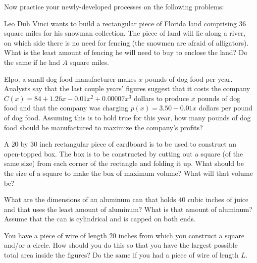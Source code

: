 \documentclass{ximera}
\begin{document}
 
Now practice your newly-developed processes on the following problems:

\begin{problem} 
Leo Duh Vinci wants to build a rectangular piece of Florida land comprising $36$ square miles for his snowman collection.  The piece of land will lie along a river, on which side there is no need for fencing (the snowmen are afraid of alligators).  What is the least amount of fencing he will need to buy to enclose the land?  Do the same if he had $A$ square miles.
\end{problem} 
\begin{problem} 
Elpo, a small dog food manufacturer makes $x$ pounds of dog food per year.  Analysts say that the last couple years' figures suggest that it costs the company $C(x) = 84+1.26x-0.01x^2+0.00007x^3$ dollars to produce $x$ pounds of dog food and that the company was charging $p(x) = 3.50 - 0.01x$ dollars per pound of dog food.  Assuming this is to hold true for this year, how many pounds of dog food should be manufactured to maximize the company's profits?
\end{problem} 
\begin{problem} 
A $20$ by $30$ inch rectangular piece of cardboard is to be used to construct an open-topped box.  The box is to be constructed by cutting out a square (of the same size) from each corner of the rectangle and folding it up.  What should be the size of a square to make the box of maximum volume?  What will that volume be?
\end{problem}
\begin{problem} 
What are the dimensions of an aluminum can that holds $40$ cubic inches of juice and that uses the least amount of aluminum?  What is that amount of aluminum?  Assume that the can is cylindrical and is capped on both ends.
\end{problem}
\begin{problem} 
You have a piece of wire of length $20$ inches from which you construct a square and/or a circle.  How should you do this so that you have the largest possible total area inside the figures?  Do the same if you had a piece of wire of length $L$.
\end{problem}
\end{document}
